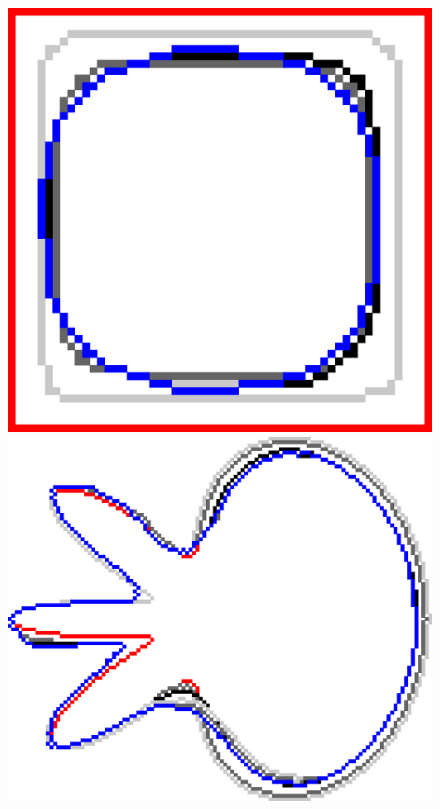 \begin{figure}[!h]
\begin{minipage}[b]{0.5\textwidth}
	\includegraphics[scale=0.17]{figures/chapter5/exhaustive-selection/mdca-lp0.01/square/summary.pdf}\\[2em]
	
	\includegraphics[scale=0.25]{figures/chapter5/exhaustive-selection/mdca-lp0.01/flower/summary.pdf}\\[2em]


\end{minipage}
\end{figure}
